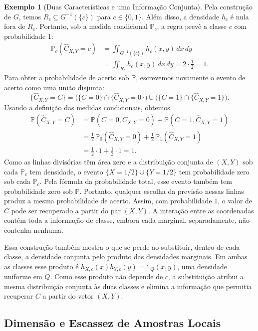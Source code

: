 \documentclass[12pt,portuguese]{article}
\theoremstyle{definition}
\newtheorem{example}[example]{Exemplo}
\theoremstyle{plainexercise}
\theoremstyle{starredexercise}
\theoremstyle{definition}
\begin{document}
\begin{example}[Duas Características e uma Informação Conjunta]
Pela construção de $G$, temos $R_c\subseteq G^{-1}(\{c\})$ para
$c\in\{0,1\}$. Além disso, a densidade $h_c$ é nula fora de $R_c$.
Portanto, sob a medida condicional $\mathbb{P}_c$, a regra prevê a classe
$c$ com probabilidade $1$:
\begin{align*}
  \mathbb{P}_c(\widehat{C}_{X,Y}=c)
  &=\iint_{G^{-1}(\{c\})}h_c(x,y)\,dx\,dy
  \\[0.2cm]
  &=\iint_{R_c}h_c(x,y)\,dx\,dy
  =2\cdot\tfrac12=1.
\end{align*}
Para obter a probabilidade de acerto sob $\mathbb{P}$, escrevemos novamente
o evento de acerto como uma união disjunta:
\[
  \{\widehat{C}_{X,Y}=C\}
  =\bigl(\{C=0\}\cap\{\widehat{C}_{X,Y}=0\}\bigr)
   \cup\bigl(\{C=1\}\cap\{\widehat{C}_{X,Y}=1\}\bigr).
\]
Usando a definição das medidas condicionais, obtemos
\begin{align*}
  \mathbb{P}(\widehat{C}_{X,Y}=C)
  &=\mathbb{P}(C=0,\widehat{C}_{X,Y}=0)
    +\mathbb{P}(C=1,\widehat{C}_{X,Y}=1)
  \\[0.2cm]
  &=\tfrac12\,\mathbb{P}_0(\widehat{C}_{X,Y}=0)
    +\tfrac12\,\mathbb{P}_1(\widehat{C}_{X,Y}=1)
  \\[0.2cm]
  &=\tfrac12\cdot1+\tfrac12\cdot1=1.
\end{align*}
Como as linhas divisórias têm área zero e a distribuição conjunta de
$(X,Y)$ sob cada $\mathbb{P}_c$ tem densidade, o evento
$\{X=1/2\}\cup\{Y=1/2\}$ tem probabilidade zero sob cada $\mathbb{P}_c$.
Pela fórmula da probabilidade total, esse evento também tem probabilidade
zero sob $\mathbb{P}$. Portanto, qualquer escolha da previsão nessas linhas
produz a mesma probabilidade de acerto.
Assim, com probabilidade $1$, o valor de $C$ pode ser recuperado a partir
do par $(X,Y)$.
A interação entre as coordenadas contém toda a informação de classe, embora
cada marginal, separadamente, não contenha nenhuma.

Essa construção também mostra o que se perde ao substituir, dentro de cada
classe, a densidade conjunta pelo produto das densidades marginais. Em ambas
as classes esse produto é
$h_{X,c}(x)h_{Y,c}(y)=\mathds{1}_{Q}(x,y)$, uma densidade uniforme em $Q$.
Como esse produto não depende de $c$, a substituição atribui a mesma
distribuição conjunta às duas classes e elimina a informação que permitia
recuperar $C$ a partir do vetor $(X,Y)$.

\end{example}

\subsection{Dimensão e Escassez de Amostras Locais}\label{subsec:dimensao-amostras-locais}
\end{document}
